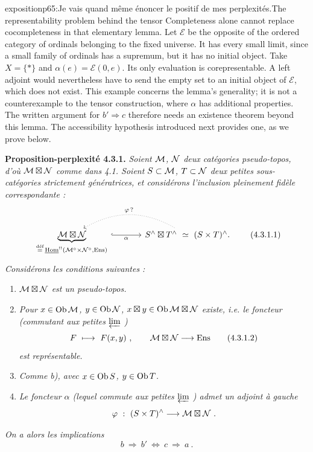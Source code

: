 \begin{dcomment}{exposition}{p65:Je vais quand même énoncer le positif de mes perplexités.}{The representability problem behind the tensor}
Completeness alone cannot replace cocompleteness in that elementary lemma.  Let $\mathcal E$ be the opposite of the ordered category of ordinals belonging to the fixed universe.  It has every small limit, since a small family of ordinals has a supremum, but it has no initial object.  Take $X=\{*\}$ and $\alpha(e)=\mathcal E(0,e)$.  Its only evaluation is corepresentable.  A left adjoint would nevertheless have to send the empty set to an initial object of $\mathcal E$, which does not exist.  This example concerns the lemma's generality; it is not a counterexample to the tensor construction, where $\alpha$ has additional properties.  The written argument for $b'\Rightarrow c$ therefore needs an existence theorem beyond this lemma.  The accessibility hypothesis introduced next provides one, as we prove below.
\end{dcomment}


\textbf{Proposition-perplexité 4.3.1.} \textit{Soient $\mathcal{M}$, $\mathcal{N}$ deux catégories pseudo-topos, d'où $\mathcal{M}\boxtimes\mathcal{N}$ comme dans 4.1. Soient $S\subset\mathcal{M}$, $T\subset\mathcal{N}$ deux petites sous-catégories strictement génératrices, et considérons l'inclusion pleinement fidèle correspondante :}
\[
\begin{tikzcd}[column sep=large]
\underbrace{\cM\bt\cN}_{\defeq\, \uHom^{!!}(\cM^{\circ}\times\cN^{\circ},\Ens)} \arrow[r, hook, "\alpha"'] & S^{\wedge}\bt T^{\wedge} \ \simeq\ (S\times T)^{\wedge}. \arrow[l, dotted, bend right, "\varphi\,?"']
\end{tikzcd}
\tag*{(4.3.1.1)}
\]
\textit{Considérons les conditions suivantes :}
\begin{enumerate}[label={}]
\item[\textit{a)}] \textit{$\mathcal{M}\boxtimes\mathcal{N}$ est un pseudo-topos.}
\item[\textit{b)}] \textit{Pour $x\in\mathrm{Ob}\,\mathcal{M}$, $y\in\mathrm{Ob}\,\mathcal{N}$, $x\boxtimes y\in\mathrm{Ob}\,\mathcal{M}\boxtimes\mathcal{N}$ existe, i.e. le foncteur (commutant aux petites $\varprojlim$ )}
\[
F \ \longmapsto\ F(x,y) \ , \qquad \cM\bt\cN \longrightarrow \Ens
\tag*{(4.3.1.2)}
\]
\textit{est représentable.}
\item[\textit{b$'$)}] \textit{Comme b), avec $x\in\mathrm{Ob}\, S$, $y\in\mathrm{Ob}\, T$.}
\item[\textit{c)}] \textit{Le foncteur $\alpha$ (lequel commute aux petites $\varprojlim$ ) admet un adjoint à gauche}
\[
\varphi \ :\ (S\times T)^{\wedge} \longrightarrow \mathcal{M}\boxtimes\mathcal{N} \ .
\]
\end{enumerate}
\textit{On a alors les implications}
\[
b \ \Longrightarrow\ b' \ \Longleftrightarrow\ c \ \Longrightarrow\ a \ .
\tag*{(4.3.1.3)}
\]

